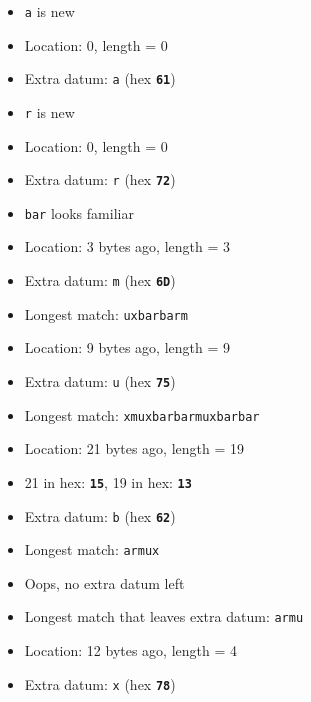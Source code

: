 \documentclass{../ucll-slides}
\newcommand{\hex}[1]{\texttt{\bfseries #1}}
\begin{document}
\begin{frame}
\begin{overprint}
    \begin{itemize}
      \item {\tt a} is new
      \item Location: 0, length = 0
      \item Extra datum: {\tt a} (hex \hex{61})
    \end{itemize}

    \begin{itemize}
      \item {\tt r} is new
      \item Location: 0, length = 0
      \item Extra datum: {\tt r} (hex \hex{72})
    \end{itemize}

    \begin{itemize}
      \item {\tt bar} looks familiar
      \item Location: 3 bytes ago, length = 3
      \item Extra datum: {\tt m} (hex \hex{6D})
    \end{itemize}

    \begin{itemize}
      \item Longest match: {\tt uxbarbarm}
      \item Location: 9 bytes ago, length = 9
      \item Extra datum: {\tt u} (hex \hex{75})
    \end{itemize}

    \begin{itemize}
      \item Longest match: {\tt xmuxbarbarmuxbarbar}
      \item Location: 21 bytes ago, length = 19
      \item 21 in hex: \hex{15}, 19 in hex: \hex{13}
      \item Extra datum: {\tt b} (hex \hex{62})
    \end{itemize}

    \begin{itemize}
      \item Longest match: {\tt armux}
      \item Oops, no extra datum left
      \item Longest match that leaves extra datum: {\tt armu}
      \item Location: 12 bytes ago, length = 4
      \item Extra datum: {\tt x} (hex \hex{78})
    \end{itemize}


\end{overprint}
\end{frame}
\end{document}
